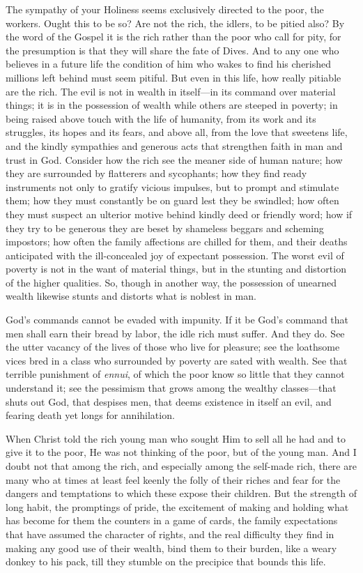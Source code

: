 \documentclass{book}
\begin{document}
The sympathy of your Holiness seems exclusively directed to the poor, the workers. Ought this to be so? Are not the rich, the idlers, to be pitied also? By the word of the Gospel it is the rich rather than the poor who call for pity, for the presumption is that they will share the fate of Dives. And to any one who believes in a future life the condition of him who wakes to find his cherished millions left behind must seem pitiful. But even in this life, how really pitiable are the rich. The evil is not in wealth in itself—in its command over material things; it is in the possession of wealth while others are steeped in poverty; in being raised above touch with the life of humanity, from its work and its struggles, its hopes and its fears, and above all, from the love that sweetens life, and the kindly sympathies and generous acts that strengthen faith in man and trust in God. Consider how the rich see the meaner side of human nature; how they are surrounded by flatterers and sycophants; how they find ready instruments not only to gratify vicious impulses, but to prompt and stimulate them; how they must constantly be on guard lest they be swindled; how often they must suspect an ulterior motive behind kindly deed or friendly word; how if they try to be generous they are beset by shameless beggars and scheming impostors; how often the family affections are chilled for them, and their deaths anticipated with the ill-concealed joy of expectant possession. The worst evil of poverty is not in the want of material things, but in the stunting and distortion of the higher qualities. So, though in another way, the possession of unearned wealth likewise stunts and distorts what is noblest in man.

God’s commands cannot be evaded with impunity. If it be God’s command that men shall earn their bread by labor, the idle rich must suffer. And they do. See the utter vacancy of the lives of those who live for pleasure; see the loathsome vices bred in a class who surrounded by poverty are sated with wealth. See that terrible punishment of \emph{ennui}, of which the poor know so little that they cannot understand it; see the pessimism that grows among the wealthy classes—that shuts out God, that despises men, that deems existence in itself an evil, and fearing death yet longs for annihilation.

When Christ told the rich young man who sought Him to sell all he had and to give it to the poor, He was not thinking of the poor, but of the young man. And I doubt not that among the rich, and especially among the self-made rich, there are many who at times at least feel keenly the folly of their riches and fear for the dangers and temptations to which these expose their children. But the strength of long habit, the promptings of pride, the excitement of making and holding what has become for them the counters in a game of cards, the family expectations that have assumed the character of rights, and the real difficulty they find in making any good use of their wealth, bind them to their burden, like a weary donkey to his pack, till they stumble on the precipice that bounds this life.
\end{document}
